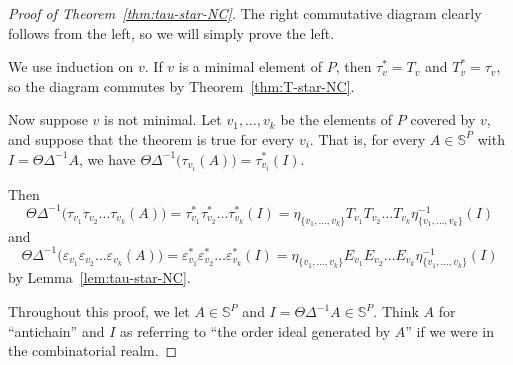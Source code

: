 \documentclass[10pt]{amsart}
\theoremstyle{definition}
\newcommand{\bbs}{\mathbb{S}}
\newcommand{\e}{\varepsilon}
\newcommand{\up}{\Delta}
\begin{document}
\begin{proof}[Proof of Theorem~\ref{thm:tau-star-NC}]
The right commutative diagram clearly follows from the left, so we will simply prove the left.

We use induction on $v$. If $v$ is a minimal element of $P$, then $\tau_v^*=T_v$ and $T_v^*=\tau_v$, so the diagram commutes by Theorem~\ref{thm:T-star-NC}.

Now suppose $v$ is not minimal. Let $v_1,\dots,v_k$ be the elements of $P$ covered by $v$, and suppose that the theorem is true for every $v_i$. That is, for every $A\in\bbs^P$ with $I=\Theta\up^{-1}A$, we have $\Theta\up^{-1}\big(\tau_{v_i}(A)\big)=\tau_{v_i}^*(I)$.

Then 
\[
\Theta\up^{-1}\big(\tau_{v_1}\tau_{v_2}\dots \tau_{v_k}(A)\big)=\tau_{v_1}^*\tau_{v_2}^*\dots \tau_{v_k}^*(I)
= \eta_{\{v_1,\dots,v_k\}} T_{v_1}T_{v_2}\dots T_{v_k} \eta_{\{v_1,\dots,v_k\}}^{-1}(I)
\]
and 
\[
\Theta\up^{-1}\big(\e_{v_1}\e_{v_2}\dots \e_{v_k}(A)\big)=\e_{v_1}^*\e_{v_2}^*\dots \e_{v_k}^*(I)
= \eta_{\{v_1,\dots,v_k\}} E_{v_1}E_{v_2}\dots E_{v_k} \eta_{\{v_1,\dots,v_k\}}^{-1}(I)
\]
by Lemma~\ref{lem:tau-star-NC}.

Throughout this proof, we let $A\in\bbs^P$ and
$I=\Theta\up^{-1}A\in\bbs^P$. Think $A$ for ``antichain'' and $I$ as referring to ``the order ideal generated by $A$''
if we were in the combinatorial realm.


\end{proof}
\end{document}

